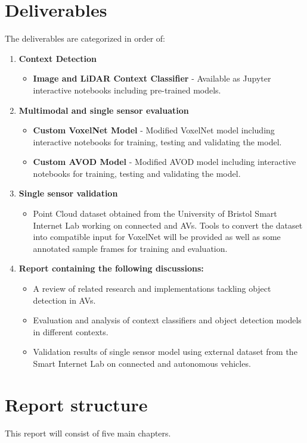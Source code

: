 \section{Deliverables}

The deliverables are categorized in order of: 
\begin{enumerate}
	\item \textbf{Context Detection}
	\begin{itemize}
		 \item \textbf{Image and LiDAR Context Classifier} - Available as Jupyter interactive notebooks including pre-trained models.  
	\end{itemize}
	\item \textbf{Multimodal and single sensor evaluation}
	\begin{itemize}
		\item \textbf{Custom VoxelNet Model} - Modified VoxelNet model including  interactive notebooks for training, testing and validating the model. 
		\item \textbf{Custom AVOD Model} - Modified AVOD model including interactive notebooks for training, testing and validating the model.
	\end{itemize}
	\item \textbf{Single sensor validation}
	\begin{itemize}
		\item Point Cloud dataset obtained from the University of Bristol Smart Internet Lab working on connected and AVs. Tools to convert the dataset into compatible input for VoxelNet will be provided as well as some annotated sample frames for training and evaluation.
		
	\end{itemize}
	\item \textbf{Report containing the following discussions:}
	\begin{itemize}
		\item A review of related research and implementations tackling object detection in AVs. 
		\item Evaluation and analysis of context classifiers and object detection models in different contexts. 
		\item Validation results of single sensor model using external dataset from the Smart Internet Lab on connected and autonomous vehicles.
	\end{itemize}
\end{enumerate}

\section{Report structure}
This report will consist of five main chapters. 

